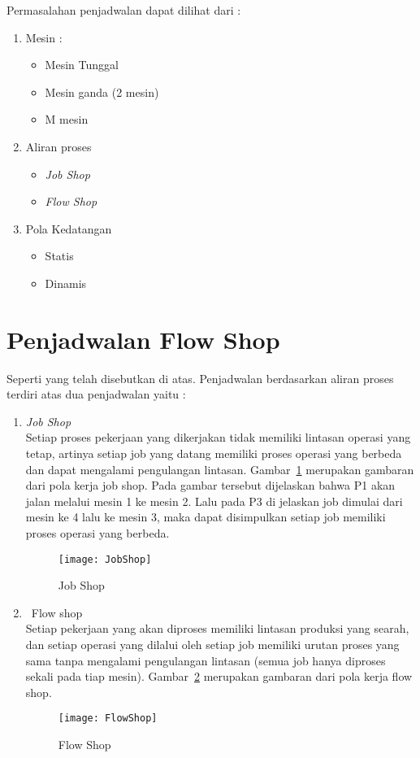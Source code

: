 	Permasalahan penjadwalan dapat dilihat dari : 
\begin{enumerate}
	\item Mesin :
	\begin{itemize}
		\item Mesin Tunggal
		\item Mesin ganda (2 mesin)
		\item M mesin
	\end{itemize}
	\item Aliran proses
	\begin{itemize}
		\item {\it Job Shop}
		\item {\it Flow Shop}
	\end{itemize}
	\item Pola Kedatangan
	\begin{itemize}
		\item Statis
		\item Dinamis
	\end{itemize}

\end{enumerate}





\section{Penjadwalan Flow Shop}
\label{sec:Flowshop}

Seperti yang telah disebutkan di atas. Penjadwalan berdasarkan aliran proses terdiri atas dua penjadwalan yaitu :
\begin{enumerate}
	\item {\it Job Shop}\\
	Setiap proses pekerjaan yang dikerjakan tidak memiliki lintasan operasi yang tetap, artinya
	setiap job yang datang memiliki proses operasi yang berbeda dan dapat mengalami pengulangan
	lintasan. Gambar~\ref{fig:JobShop} merupakan gambaran dari pola kerja job shop. Pada gambar tersebut dijelaskan 
	bahwa P1 akan jalan melalui mesin 1 ke mesin 2. Lalu pada P3 di jelaskan job dimulai dari mesin ke 4 lalu ke mesin 3, 
	maka dapat disimpulkan setiap job memiliki proses operasi yang berbeda.
	\begin{figure}[H]
		\centering  
		\texttt{[image: JobShop]}  
		\caption[Job Shop]{Job Shop} 
		\label{fig:JobShop} 
	\end{figure}
	
			
	\item {\ Flow shop}\\
	Setiap pekerjaan yang akan diproses memiliki lintasan produksi yang searah, dan setiap operasi
	yang dilalui oleh setiap job memiliki urutan proses yang sama tanpa mengalami pengulangan
	lintasan (semua job hanya diproses sekali pada tiap mesin). Gambar~\ref{fig:FlowShop} merupakan
	gambaran dari pola kerja flow shop.
	\begin{figure}[H]
		\centering  
		\texttt{[image: FlowShop]}  
		\caption[Flow Shop]{Flow Shop} 
		\label{fig:FlowShop} 
	\end{figure}
	
\end{enumerate}

